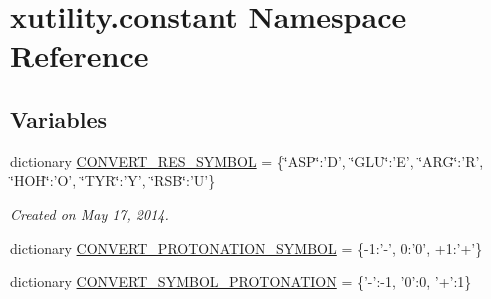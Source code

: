 \hypertarget{namespacexutility_1_1constant}{\section{xutility.\-constant Namespace Reference}
\label{namespacexutility_1_1constant}
}
\subsection*{Variables}
\begin{DoxyCompactItemize}
\item 
dictionary \hyperlink{namespacexutility_1_1constant_a71b4ab5c813015d4d0eddf0acf51d2be}{C\-O\-N\-V\-E\-R\-T\-\_\-\-R\-E\-S\-\_\-\-S\-Y\-M\-B\-O\-L} = \{\char`\"{}A\-S\-P\char`\"{}\-:'D', \char`\"{}G\-L\-U\char`\"{}\-:'E', \char`\"{}A\-R\-G\char`\"{}\-:'R', \char`\"{}H\-O\-H\char`\"{}\-:'O', \char`\"{}T\-Y\-R\char`\"{}\-:'Y', \char`\"{}R\-S\-B\char`\"{}\-:'U'\}
\begin{DoxyCompactList}\small\item\em Created on May 17, 2014. \end{DoxyCompactList}\item 
dictionary \hyperlink{namespacexutility_1_1constant_ac01a3fdf01043a4ba544f77e1e26d236}{C\-O\-N\-V\-E\-R\-T\-\_\-\-P\-R\-O\-T\-O\-N\-A\-T\-I\-O\-N\-\_\-\-S\-Y\-M\-B\-O\-L} = \{-\/1\-:'-\/', 0\-:'0', +1\-:'+'\}
\item 
dictionary \hyperlink{namespacexutility_1_1constant_a19ac508c445f199789a7e213d76649fb}{C\-O\-N\-V\-E\-R\-T\-\_\-\-S\-Y\-M\-B\-O\-L\-\_\-\-P\-R\-O\-T\-O\-N\-A\-T\-I\-O\-N} = \{'-\/'\-:-\/1, '0'\-:0, '+'\-:1\}
\end{DoxyCompactItemize}


